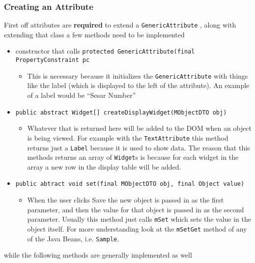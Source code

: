 \documentclass[10pt,letterpaper,onecolumn,oneside]{report}
\begin{document}
\subsubsection{Creating an Attribute}
First off attributes are \textbf{required} to extend a \texttt{GenericAttribute}
, along with extending that class a few methods need to be implemented
\begin{itemize}
\item constructor that calls \texttt{protected GenericAttribute(final PropertyConstraint pc}
\begin{itemize}
\item This is necessary because it initializes the \texttt{GenericAttribute}
with things like the label (which is displayed to the left of the attribute).  An example of a label would be ``Sesar Number''
\end{itemize}
\item \texttt{public abstract Widget[] createDisplayWidget(MObjectDTO obj)}
\begin{itemize}
\item Whatever that is returned here will be added to the DOM when an object
is being viewed.  For example with the \texttt{TextAttribute} this method
returns just a \texttt{Label} because it is used to show data.  The reason
that this methods returns an array of \texttt{Widget}s is because for each
widget in the array a new row in the display table will be added.
\end{itemize}
\item \texttt{public abtract void set(final MObjectDTO obj, final Object value)}
\begin{itemize}
\item When the user clicks Save the new object is passed in as the first
parameter, and then the value for that object is passed in as the second
parameter.  Usually this method just calls \texttt{mSet} which sets the value
in the object itself.  For more understanding look at the \texttt{mSetGet}
method of any of the Java Beans, i.e. \texttt{Sample}.
\end{itemize}
\end{itemize}
while the following methods are generally implemented as well
\end{document}
